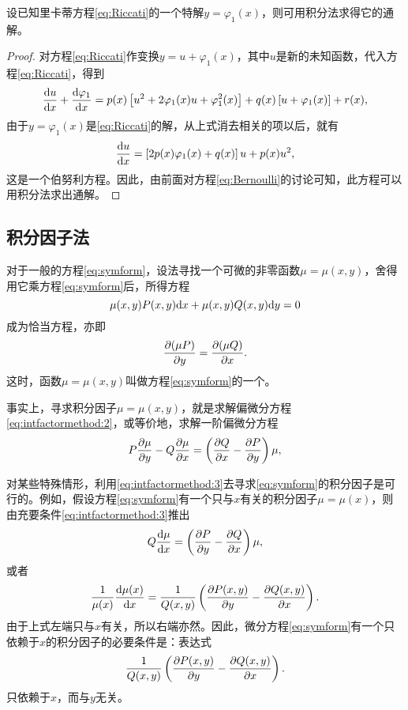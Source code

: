 \begin{theo}\label{theo:Riccati:sol}
设已知里卡蒂方程\eqref{eq:Riccati}的一个特解$y=\varphi_1(x)$，则可用积分法求得它的通解。
\end{theo}
\begin{proof}
对方程\eqref{eq:Riccati}作变换$y=u+\varphi_1(x)$，其中$u$是新的未知函数，代入方程\eqref{eq:Riccati}，得到
\[
\frac{\mathrm{d}{}u}{\mathrm{d}{}x}+\frac{\mathrm{d}{}\varphi_1}{\mathrm{d}{}x}=p(x)\left[u^2+2\varphi_1(x)u+\varphi_1^2(x)\right]+q(x)\left[u+\varphi_1(x)\right]+r(x),
\]
由于$y=\varphi_1(x)$是\eqref{eq:Riccati}的解，从上式消去相关的项以后，就有
\[
\frac{\mathrm{d}{}u}{\mathrm{d}{}x}=\left[2p(x)\varphi_1(x)+q(x)\right]u+p(x)u^2,
\]
这是一个伯努利方程。因此，由前面对方程\eqref{eq:Bernoulli}的讨论可知，此方程可以用积分法求出通解。
\end{proof}

\subsection{积分因子法}
对于一般的方程\eqref{eq:symform}，设法寻找一个可微的非零函数$\mu=\mu(x,y)$，舍得用它乘方程\eqref{eq:symform}后，所得方程
\begin{equation}\label{eq:intfactormethod:1}
\mu(x,y)P(x,y)\mathrm{d} x+\mu(x,y)Q(x,y)\mathrm{d} y=0
\end{equation}
成为恰当方程，亦即
\begin{equation}\label{eq:intfactormethod:2}
\frac{\partial{}(\mu P)}{\partial{}y}=\frac{\partial{}(\mu Q)}{\partial{}x}.
\end{equation}
这时，函数$\mu=\mu(x,y)$叫做方程\eqref{eq:symform}的一个。

事实上，寻求积分因子$\mu=\mu(x,y)$，就是求解偏微分方程\eqref{eq:intfactormethod:2}，或等价地，求解一阶偏微分方程
\begin{equation}\label{eq:intfactormethod:3}
P\frac{\partial{}\mu}{\partial{}y}-Q\frac{\partial{}\mu}{\partial{}x}=\left(\frac{\partial{}Q}{\partial{}x}-\frac{\partial{}P}{\partial{}y}\right)\mu,
\end{equation}

对某些特殊情形，利用\eqref{eq:intfactormethod:3}去寻求\eqref{eq:symform}的积分因子是可行的。例如，假设方程\eqref{eq:symform}有一个只与$x$有关的积分因子$\mu=\mu(x)$，则由充要条件\eqref{eq:intfactormethod:3}推出
\[
Q\frac{\mathrm{d}{}\mu}{\mathrm{d}{}x}=\left(\frac{\partial{}P}{\partial{}y}-\frac{\partial{}Q}{\partial{}x}\right)\mu,
\]
或者
\begin{equation}\label{eq:intfactormethod:4}
\frac{1}{\mu(x)}\frac{\mathrm{d}{}\mu(x)}{\mathrm{d}{}x}=\frac{1}{Q(x,y)}\left(\frac{\partial{}P(x,y)}{\partial{}y}-\frac{\partial{}Q(x,y)}{\partial{}x}\right).
\end{equation}
由于上式左端只与$x$有关，所以右端亦然。因此，微分方程\eqref{eq:symform}有一个只依赖于$x$的积分因子的必要条件是：表达式
\begin{equation}\label{eq:intfactormethod:5}
\frac{1}{Q(x,y)}\left(\frac{\partial{}P(x,y)}{\partial{}y}-\frac{\partial{}Q(x,y)}{\partial{}x}\right).
\end{equation}
只依赖于$x$，而与$y$无关。


